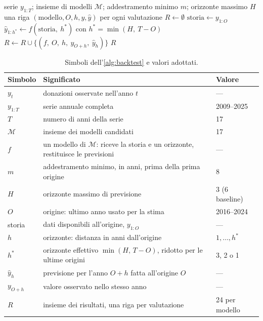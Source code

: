 \begin{algorithm}[H]
\caption{Backtest a origine mobile con finestra espansiva}
\label{alg:backtest}
\begin{algorithmic}[1]
\Require serie $y_{1:T}$; insieme di modelli $\mathcal{M}$; addestramento minimo
$m$; orizzonte massimo $H$
\Ensure una riga $(\text{modello}, O, h, y, \hat{y})$ per ogni valutazione
\State $R \gets \emptyset$
  \State $\text{storia} \gets y_{1:O}$
    \State $\hat{y}_{1:h^*} \gets f(\text{storia},\ h^*)$ \quad con
    $h^* = \min(H,\ T-O)$
      \State $R \gets R \cup \{(f,\ O,\ h,\ y_{O+h},\ \hat{y}_h)\}$
    \EndFor
  \EndFor
\EndFor
\State \Return $R$
\end{algorithmic}
\end{algorithm}

\begin{table}[H]
\centering
\small
\caption{Simboli dell'\cref{alg:backtest} e valori adottati.}
\label{tab:backtest_simboli}
\begin{tabularx}{\linewidth}{@{}l X l@{}}
\toprule
\textbf{Simbolo} & \textbf{Significato} & \textbf{Valore} \\
\midrule
$y_t$ & donazioni osservate nell'anno $t$ & --- \\
$y_{1:T}$ & serie annuale completa & 2009--2025 \\
$T$ & numero di anni della serie & 17 \\
$\mathcal{M}$ & insieme dei modelli candidati & 17 \\
$f$ & un modello di $\mathcal{M}$: riceve la storia e un orizzonte, restituisce le previsioni & --- \\
$m$ & addestramento minimo, in anni, prima della prima origine & 8 \\
$H$ & orizzonte massimo di previsione & 3 (6 baseline) \\
$O$ & origine: ultimo anno usato per la stima & 2016--2024 \\
storia & dati disponibili all'origine, $y_{1:O}$ & --- \\
$h$ & orizzonte: distanza in anni dall'origine & $1,\dots,h^*$ \\
$h^*$ & orizzonte effettivo $\min(H,\,T-O)$, ridotto per le ultime origini & 3, 2 o 1 \\
$\hat{y}_h$ & previsione per l'anno $O+h$ fatta all'origine $O$ & --- \\
$y_{O+h}$ & valore osservato nello stesso anno & --- \\
$R$ & insieme dei risultati, una riga per valutazione & 24 per modello \\
\bottomrule
\end{tabularx}
\end{table}

